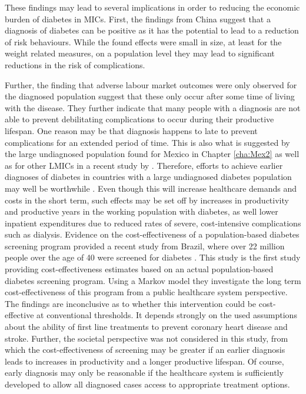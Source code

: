 These findings may lead to several implications in order to reducing the economic burden of diabetes in \acp{MIC}. First, the findings from China suggest that a diagnosis of diabetes can be positive as it has the potential to lead to a reduction of risk behaviours. While the found effects were small in size, at least for the weight related measures, on a population level they may lead to significant reductions in the risk of complications.

Further, the finding that adverse labour market outcomes were only observed for the diagnosed population suggest that these only occur after some time of living with the disease. They further indicate that many people with a diagnosis are not able to prevent debilitating complications to occur during their productive lifespan. One reason may be that diagnosis happens to late to prevent complications for an extended period of time. This is also what is suggested by the large undiagnosed population found for Mexico in Chapter \ref{cha:Mex2} as well as for other \acp{LMIC} in a recent study by \textcite{Beagley2014}. Therefore, efforts to achieve earlier diagnoses of diabetes in countries with a large undiagnosed diabetes population may well be worthwhile \parencite{Engelgau2012}. Even though this will increase healthcare demands and costs in the short term, such effects may be set off by increases in productivity and productive years in the working population with diabetes, as well lower inpatient expenditures due to reduced rates of severe, cost-intensive complications such as dialysis. Evidence on the cost-effectiveness of a population-based diabetes screening program provided a recent study from Brazil, where over 22 million people over the age of 40 were screened for diabetes \parencite{Toscano2015}. This study is the first study providing cost-effectiveness estimates based on an actual population-based diabetes screening program. Using a Markov model they investigate the long term cost-effectiveness of this program from a public healthcare system perspective. The findings are inconclusive as to whether this intervention could be cost-effective at conventional thresholds. It depends strongly on the used assumptions about the ability of first line treatments to prevent coronary heart disease and stroke. Further, the societal perspective was not considered in this study, from which the cost-effectiveness of screening may be greater if an earlier diagnosis leads to increases in productivity and a longer productive lifespan. Of course, early diagnosis may only be reasonable if the healthcare system is sufficiently developed to allow all diagnosed cases access to appropriate treatment options. 

